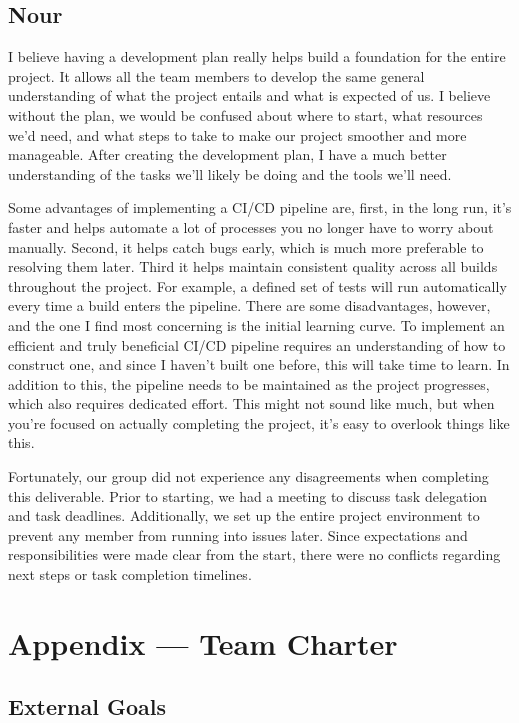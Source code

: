 \documentclass{article}
\begin{document}
\subsection*{Nour}
I believe having a development plan really helps build a foundation for the entire project. 
It allows all the team members to develop the same general understanding of what the project entails and what is expected of us. 
I believe without the plan, we would be confused about where to start, what resources we’d need, and what steps to take to make our project smoother and more manageable. 
After creating the development plan, I have a much better understanding of the tasks we’ll likely be doing and the tools we’ll need. 

Some advantages of implementing a CI/CD pipeline are, first, in the long run, it’s faster and helps automate a lot of processes you no longer have to worry about manually. 
Second, it helps catch bugs early, which is much more preferable to resolving them later. 
Third it helps maintain consistent quality across all builds throughout the project. 
For example, a defined set of tests will run automatically every time a build enters the pipeline. 
There are some disadvantages, however, and the one I find most concerning is the initial learning curve. 
To implement an efficient and truly beneficial CI/CD pipeline requires an understanding of how to construct one, and since I haven't built one before, this will take time to learn. 
In addition to this, the pipeline needs to be maintained as the project progresses, which also requires dedicated effort.  
This might not sound like much, but when you're focused on actually completing the project, it's easy to overlook things like this.

Fortunately, our group did not experience any disagreements when completing this deliverable. 
Prior to starting, we had a meeting to discuss task delegation and task deadlines. 
Additionally, we set up the entire project environment to prevent any member from running into issues later. 
Since expectations and responsibilities were made clear from the start, there were no conflicts regarding next steps or task completion timelines.

\newpage{}

\section*{Appendix --- Team Charter}

\subsection*{External Goals}
\end{document}
